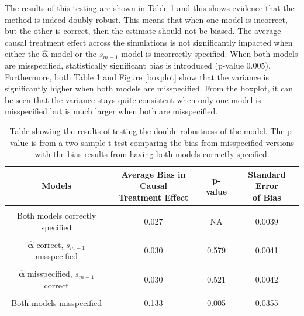 The results of this testing are shown in Table \ref{doubletest} and this shows evidence that the method is indeed doubly robust.  This means that when one model is incorrect, but the other is correct, then the estimate should not be biased.  The average causal treatment effect across the simulations is not significantly impacted when either the $\hat{\mathbf{\alpha}}$ model or the $s_{m-1}$ model is incorrectly specified.  When both models are misspecified, statistically significant bias is introduced (p-value 0.005).  Furthermore, both Table \ref{doubletest} and Figure \ref{boxplot} show that the variance is significantly higher when both models are misspecified.  From the boxplot, it can be seen that the variance stays quite consistent when only one model is misspecified but is much larger when both are misspecified.  


\begin{table}[h!]
\centering
\begin{tabular} {c | c  c c}
Models & \shortstack{Average Bias in Causal \\ Treatment Effect} & p-value & \shortstack{Standard Error\\ of Bias} \\ 
\hline  \\
Both models correctly specified &0.027 & NA  & 0.0039\\ \\
$\hat{\mathbf{\alpha}}$ correct, $s_{m-1}$ misspecified & 0.030 & 0.579 & 0.0041\\ \\
$\hat{\mathbf{\alpha}}$ misspecified, $s_{m-1}$ correct & 0.030 & 0.521 &0.0042 \\ \\
Both models misspecified & 0.133 & 0.005 & 0.0355 
\end{tabular} \\
\centering
\caption{Table showing the results of testing the double robustness of the model.  The p-value is from a two-sample t-test comparing the bias from misspecified versions with the bias results from having both models correctly specified. \label{doubletest}}
\end{table}


